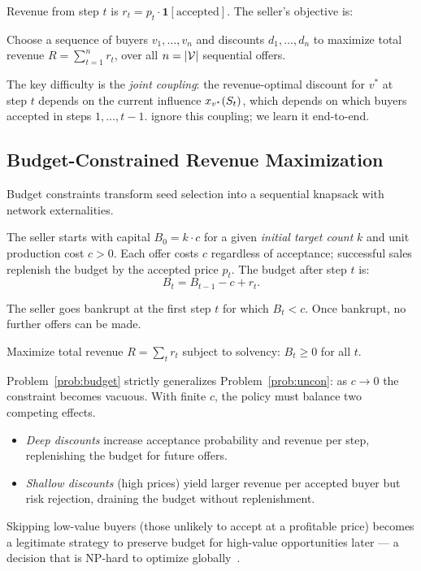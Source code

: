 Revenue from step $t$ is $r_t = p_t \cdot \mathbf{1}[\text{accepted}]$.
The seller's objective is:

\begin{problem}\label{prob:uncon}
Choose a sequence of buyers $v_1, \ldots, v_n$ and discounts $d_1, \ldots, d_n$
to maximize total revenue $R = \sum_{t=1}^{n} r_t$,
over all $n = |\mathcal{V}|$ sequential offers.
\end{problem}

\noindent
The key difficulty is the \emph{joint coupling}: the revenue-optimal discount for
$v^*$ at step $t$ depends on the current influence $x_{v^*}(S_t)$, which depends on
which buyers accepted in steps $1, \ldots, t-1$.
\citet{babaei2013revenue} ignore this coupling; we learn it end-to-end.

\subsection{Budget-Constrained Revenue Maximization}
\label{sec:budget}

Budget constraints transform seed selection into a sequential knapsack with
network externalities.

\begin{definition}
The seller starts with capital $B_0 = k \cdot c$ for a given
\emph{initial target count} $k$ and unit production cost $c > 0$.
Each offer costs $c$ regardless of acceptance; successful sales replenish the
budget by the accepted price $p_t$.
The budget after step $t$ is:
\[
  B_{t} = B_{t-1} - c + r_t.
\]
\end{definition}

\begin{definition}[Bankruptcy]
The seller goes bankrupt at the first step $t$ for which $B_t < c$.
Once bankrupt, no further offers can be made.
\end{definition}

\begin{problem}\label{prob:budget}
Maximize total revenue $R = \sum_t r_t$ subject to solvency: $B_t \ge 0$ for all $t$.
\end{problem}

\noindent
Problem~\ref{prob:budget} strictly generalizes Problem~\ref{prob:uncon}:
as $c \to 0$ the constraint becomes vacuous.
With finite $c$, the policy must balance two competing effects.
\begin{itemize}[leftmargin=*,topsep=2pt,itemsep=0pt]
  \item \emph{Deep discounts} increase acceptance probability and revenue per step,
    replenishing the budget for future offers.
  \item \emph{Shallow discounts} (high prices) yield larger revenue per accepted
    buyer but risk rejection, draining the budget without replenishment.
\end{itemize}
Skipping low-value buyers (those unlikely to accept at a profitable price) becomes
a legitimate strategy to preserve budget for high-value opportunities later —
a decision that is NP-hard to optimize globally~\citep{papadimitriou1994complexity}.

